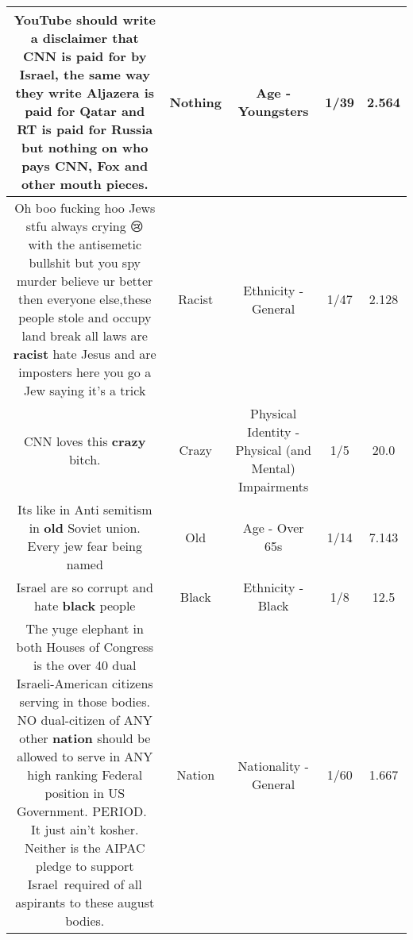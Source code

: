 \documentclass[11pt]{article}
\newlength\mylength
\begin{document}
\begin{center}
\begin{longtable}{|C{.65\mylength}|C{.30\mylength}|C{.12\mylength}|C{.12\mylength}|C{.12\mylength}|}
  \small YouTube should write a disclaimer that CNN is paid for by Israel, the same way they write Aljazera is paid for Qatar and RT is paid for Russia but \textbf{nothing} on who pays CNN, Fox and other mouth pieces.\normalsize   & Nothing & Age - Youngsters & 1/39 & 2.564 \\  \hline
  \small Oh boo fucking hoo Jews stfu always crying 😢 with the antisemetic  bullshit but you spy murder believe ur better then everyone else,these people stole and occupy land break all laws are \textbf{racist} hate Jesus and are imposters here you go a Jew saying it's a trick\normalsize   & Racist & Ethnicity - General & 1/47 & 2.128 \\  \hline
  \small CNN loves this \textbf{crazy} bitch.\normalsize   & Crazy & Physical Identity - Physical (and Mental) Impairments & 1/5 & 20.0 \\  \hline
  \small Its like in Anti semitism in \textbf{old} Soviet union. Every jew fear being named\normalsize   & Old & Age - Over 65s & 1/14 & 7.143 \\  \hline
  \small Israel are so corrupt and hate \textbf{black} people\normalsize   & Black & Ethnicity - Black & 1/8 & 12.5 \\  \hline
  \small The yuge elephant in both Houses of Congress is the over 40 dual Israeli-American citizens serving in those bodies. NO dual-citizen of ANY other \textbf{nation} should be allowed to serve in ANY high ranking Federal position in US Government. PERIOD.  It just ain't kosher. Neither is the AIPAC pledge to support Israel required of all aspirants to these august bodies.\normalsize   & Nation & Nationality - General & 1/60 & 1.667 \\  \hline

\end{longtable}
\end{center}
\end{document}
